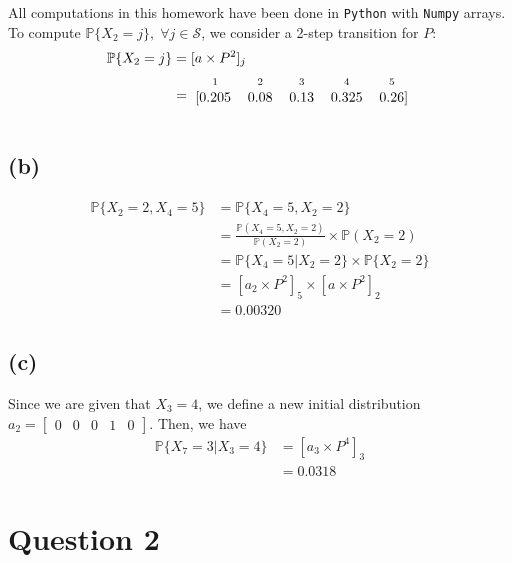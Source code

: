 \documentclass[12pt]{article}
\newcommand{\matindex}[1]{\mbox{\scriptsize#1}}%
\begin{document}
All computations in this homework have been done in \texttt{Python} with \texttt{Numpy} arrays. To compute $ \mathbb{P} \{X_2 = j\}, \; \forall j \in \mathcal{S}$, we consider a 2-step transition for $P$: \begin{align*}
    \mathbb{P}\{X_2 = j\} &= [a \times P^{2}]_j \\ 
    &= \begin{blockarray}{ccccc}
        \matindex{1} & \matindex{2} & \matindex{3} & \matindex{4} & \matindex{5} \\ 
        \begin{block}{[ccccc]}
        0.205 & 0.08 & 0.13 & 0.325 & 0.26 \\ 
        \end{block}
    \end{blockarray}
\end{align*}

\subsection*{(b)}

\begin{align*}
    \mathbb{P}\{X_2 = 2 , X_4 = 5\} &= \mathbb{P}\{X_4 = 5 , X_2 = 2\} \\ 
    &= \frac{ \mathbb{P}(X_4 = 5, X_2 = 2)}{ \mathbb{P}(X_2 = 2)} \times \mathbb{P}(X_2 = 2) \\ 
    &= \mathbb{P}\{X_4 = 5 | X_2 = 2\} \times \mathbb{P}\{X_2 = 2\} \\ 
    &= [a_2 \times P^{2}]_5 \times [a \times P^{2}]_2 \\ 
    &= 0.00320
\end{align*}

\subsection*{(c)}

Since we are given that $X_3 = 4$, we define a new initial distribution $a_2 = \begin{bmatrix}
    0&0&0&1&0
\end{bmatrix}$. Then, we have \begin{align*}
    \mathbb{P}\{X_7 = 3 | X_3 = 4\} &= [a_3 \times P^{4}]_3 \\ 
    &= 0.0318
\end{align*}

\section*{Question 2}
\end{document}
